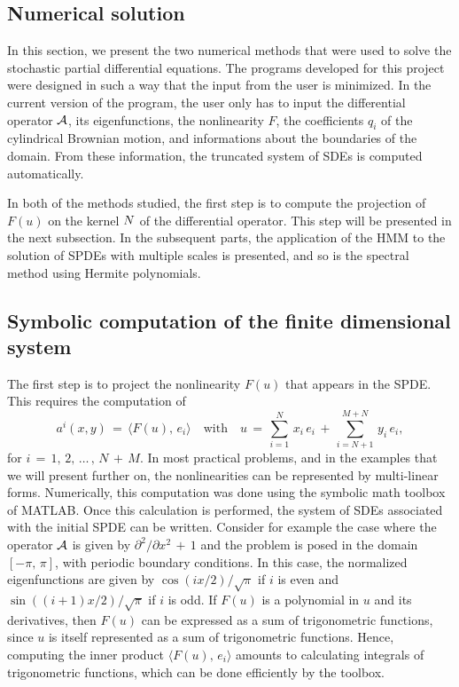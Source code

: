 \subsection{Numerical solution} 
\label{sec:Numerical solution}
In this section, we present the two numerical methods that were used to
solve the stochastic partial differential equations. The programs developed for
this project were designed in such a way that the input from the user is
minimized. In the current version of the program, the user only has to input
the differential operator $\mathcal A$, its eigenfunctions, the nonlinearity
$F$, the coefficients $q_i$ of the cylindrical Brownian motion, and
informations about the boundaries of the domain. From these information, the
truncated system of SDEs is computed automatically.

In both of the methods studied, the first step is to compute the projection of $F(u)$
on the kernel $\space N$ of the differential operator. This step will be presented
in the next subsection. In the subsequent parts, the application of the HMM to
the solution of SPDEs with multiple scales is presented, and so is the spectral
method using Hermite polynomials.

\subsection{Symbolic computation of the finite dimensional system}
\label{sub:Projection of F(u) on  N}
The first step is to project the nonlinearity $F(u)$ that appears in the SPDE.
This requires the computation of
$$
a^i(x,y) \,=\, \langle F(u),\, e_i\rangle \quad
\text{with} \quad u \,=\, \sum^{N}_{i=1} \, x_i \, e_i \,+\,
\sum^{M+N}_{i=N+1}\, y_i \, e_i,
$$
for $i \,=\, 1,\,2,\,{\dots}\,,\, N \,+\, M$. In most practical problems, and in the examples
that we will present further on,  the nonlinearities can be represented by
multi-linear forms.  Numerically, this computation was done using the symbolic
math toolbox of MATLAB. Once this calculation is performed, the system of SDEs
associated with the initial SPDE can be written. Consider for example the case
where the operator $\mathcal A$ is given by ${\partial}^2/{\partial}x^2 \,+\,1$ and the problem
is posed in the domain $[-{\pi},\,{\pi}]$, with periodic boundary conditions. In this
case, the normalized eigenfunctions are given by $\cos(ix/2)/\sqrt{\pi}$ if $i$ is
even and $\sin((i+1)x/2)/\sqrt{\pi}$ if $i$ is odd. If $F(u)$ is a polynomial in
$u$ and its derivatives, then $F(u)$ can be expressed as a sum of trigonometric
functions, since $u$ is
itself
represented as a sum of trigonometric functions. Hence, computing the inner
product $\langle F(u),\, e_i \rangle$ amounts to calculating integrals of
trigonometric functions, which can be done efficiently by the toolbox.

